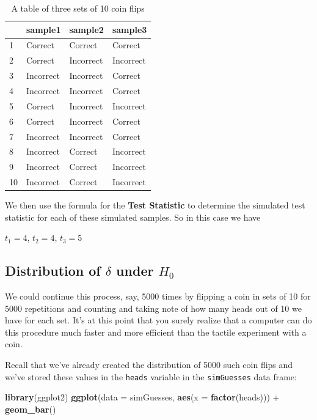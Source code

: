\documentclass[]{tufte-book}
\newenvironment{Shaded}{\begin{snugshade}}{\end{snugshade}}
\newcommand{\KeywordTok}[1]{\textcolor[rgb]{0.13,0.29,0.53}{\textbf{{#1}}}}
\newcommand{\DataTypeTok}[1]{\textcolor[rgb]{0.13,0.29,0.53}{{#1}}}
\newcommand{\StringTok}[1]{\textcolor[rgb]{0.31,0.60,0.02}{{#1}}}
\newcommand{\NormalTok}[1]{{#1}}
\begin{document}
\begin{table}

\caption{\label{tab:sample-table}A table of three sets of 10 coin flips}
\centering
\begin{tabular}[t]{l|l|l|l}
\hline
  & sample1 & sample2 & sample3\\
\hline
1 & Correct & Correct & Correct\\
\hline
2 & Correct & Incorrect & Incorrect\\
\hline
3 & Incorrect & Incorrect & Correct\\
\hline
4 & Incorrect & Incorrect & Correct\\
\hline
5 & Correct & Incorrect & Incorrect\\
\hline
6 & Correct & Incorrect & Correct\\
\hline
7 & Incorrect & Incorrect & Correct\\
\hline
8 & Incorrect & Correct & Incorrect\\
\hline
9 & Incorrect & Correct & Incorrect\\
\hline
10 & Incorrect & Correct & Incorrect\\
\hline
\end{tabular}
\end{table}

We then use the formula for the \textbf{Test Statistic} to determine the
simulated test statistic for each of these simulated samples. So in this
case we have

\(t_1 = 4\), \(t_2 = 4\), \(t_3 = 5\)

\subsection{\texorpdfstring{Distribution of \(\delta\) under
\(H_0\)}{Distribution of \textbackslash{}delta under H\_0}}\label{distribution-of-delta-under-h_0}

We could continue this process, say, 5000 times by flipping a coin in
sets of 10 for 5000 repetitions and counting and taking note of how many
heads out of 10 we have for each set. It's at this point that you surely
realize that a computer can do this procedure much faster and more
efficient than the tactile experiment with a coin.

Recall that we've already created the distribution of 5000 such coin
flips and we've stored these values in the \texttt{heads} variable in
the \texttt{simGuesses} data frame:

\begin{Shaded}
\begin{Highlighting}[]
\KeywordTok{library}\NormalTok{(ggplot2)}
\KeywordTok{ggplot}\NormalTok{(}\DataTypeTok{data =} \NormalTok{simGuesses, }\KeywordTok{aes}\NormalTok{(}\DataTypeTok{x =} \KeywordTok{factor}\NormalTok{(heads))) +}
\StringTok{  }\KeywordTok{geom_bar}\NormalTok{()}
\end{Highlighting}
\end{Shaded}
\end{document}
